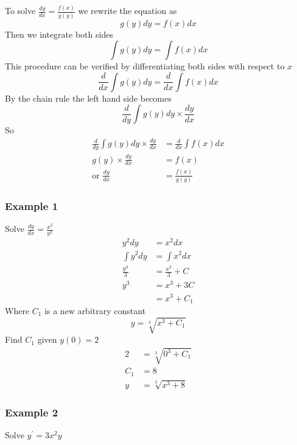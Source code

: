 To solve $\frac{d y}{d x} =\frac{f (x)}{g (y)}$ we rewrite the equation as
\begin{equation*}g (y) d y =f (x) d x
\end{equation*}Then we integrate both sides
\begin{equation*}\int g (y) d y =\int f (x) d x
\end{equation*}This procedure can be verified by differentiating both sides with respect to $x$
\begin{equation*}\frac{d}{d x} \int g (y) d y =\frac{d}{d x} \int f (x) d x
\end{equation*}By the chain rule the left hand side becomes
\begin{equation*}\frac{d}{d y} \int g (y) d y \times \frac{d y}{d x}
\end{equation*}So
\begin{align*}\frac{d}{d y} \int g (y) d y \times \frac{d y}{d x} &    = \frac{d}{d x} \int f (x) d x \\
g (y) \times \frac{d y}{d x} &    = f (x) \\
\text{or\  \  \ }\frac{d y}{d x} &    = \frac{f (x)}{g (y)}\end{align*}

\subsubsection{Example 1}
Solve $\frac{d y}{d x} =\frac{x^{2}}{y^{2}}$
\begin{align*}y^{2} d y &    = x^{2} d x \\
\int y^{2} d y &    = \int x^{2} d x \\
\frac{y^{3}}{3} &    = \frac{x^{3}}{3} +C \\
y^{3} &    = x^{3} +3 C \\
 &    = x^{3} +C_{1}\end{align*}Where $C_{1}$ is a new arbitrary constant
\begin{equation*}y =\sqrt[{3}]{x^{3} +C_{1}}
\end{equation*}Find $C_{1}$ given $y (0) =2$
\begin{align*}2 &    = \sqrt[{3}]{0^{3} +C_{1}} \\
C_{1} &    = 8 \\
y &    = \sqrt[{3}]{x^{3} +8}\end{align*}

\subsubsection{Example 2}
Solve $y^{ \prime } =3 x^{2} y$ 

